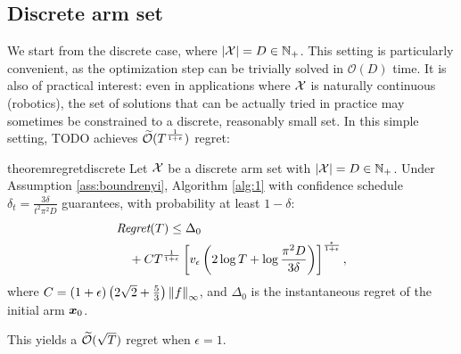 \documentclass{article}
\makeatletter
\DeclareRobustCommand{\algoname}{TODO\@\xspace}
\makeatother
\begin{document}
\subsection{Discrete arm set}
We start from the discrete case, where $|\mathcal{X}| = D \in \Naturals_{+}$.
This setting is particularly convenient, as the optimization step can be trivially solved in $\mathcal{O}(D)$ time. It is also of practical interest: even in applications where $\Xspace$ is naturally continuous (\eg robotics), the set of solutions that can be actually tried in practice may sometimes be constrained to a discrete, reasonably small set. In this simple setting, \algoname achieves $\wt{\mathcal{O}}(T^{\frac{1}{1+\epsilon}})$ regret:

\begin{restatable}{theorem}{regretdiscrete}\label{th:regretdiscrete}
	Let $\Xspace$ be a discrete arm set with ${|\mathcal{X}| = D \in \Naturals_{+}}$. Under Assumption \ref{ass:boundrenyi}, Algorithm \ref{alg:1} with confidence schedule $\delta_t = \frac{3\delta}{t^2\pi^2D}$ guarantees, with probability at least $1-\delta$:
	\begin{align*}
		&\Reg(T) \leq \Delta_0 \\
		&\quad+ 	C
			T^{\frac{1}{1+\epsilon}}
			\left[v_{\epsilon}
			\left(2\log T + \log \frac{\pi^2D}{3\delta}\right)
			\right]^{\frac{\epsilon}{1+\epsilon}},
	\end{align*}
	where $C=(1+\epsilon)\left(2\sqrt{2}+\frac{5}{3}\right)\norm[\infty]{f}$, and $\Delta_0$ is the instantaneous regret of the initial arm $\vx_0$.
\end{restatable}
This yields a $\wt{\mathcal{O}}(\sqrt{T})$ regret when $\epsilon=1$.
\end{document}
